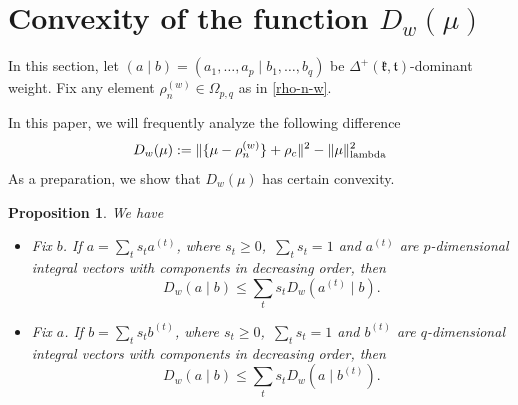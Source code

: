 \documentclass[11pt]{amsart}
\theoremstyle{plain}
\newtheorem{prop}[thm]{Proposition}
\theoremstyle{definition}
\newcommand{\frk}{\mathfrak{k}}
\newcommand{\frt}{\mathfrak{t}}
\begin{document}
\section{Convexity of the function $D_w(\mu)$}\label{sec-convexity}
In this section, let $(a\mid b)=(a_1,\dots,a_p\mid b_1, \dots, b_q)$ be $\Delta^+(\frk,\frt)$-dominant weight. Fix any element $\rho_n^{(w)}\in \Omega_{p, q}$ as in \eqref{rho-n-w}.

In this paper, we will frequently analyze the following difference
\begin{equation}\label{D-w-mu}
D_{w}(\mu) :=\Vert \{\mu-\rho_n^{(w)}\} +\rho_c \Vert^2-\|\mu\|_{\rm lambda}^2
\end{equation}
As a preparation, we show that $D_{w}(\mu)$ has certain convexity.

 \begin{prop}\label{Jensen}
 	 We have
 	\begin{itemize} 		
 	\item[(i)] Fix $b$. If $a=\sum_ts_ta^{(t)}$, where $s_t\ge 0$,\ $\sum_ts_t=1$ and $a^{(t)}$ are $p$-dimensional integral vectors with components in decreasing order, then 	
 \[D_w(a\mid b)\le\sum_t s_t D_w(a^{(t)} \mid b ).\]
 \item[(ii)] Fix $a$. If $b=\sum_ts_tb^{(t)}$, where $s_t\ge 0$,\ $\sum_ts_t=1$ and $b^{(t)}$ are $q$-dimensional integral vectors with components in decreasing order, then
     \[D_w(a\mid b)\le\sum_t s_t D_w(a \mid b^{(t)} ).\]
 	\end{itemize}
 \end{prop}
\end{document}
